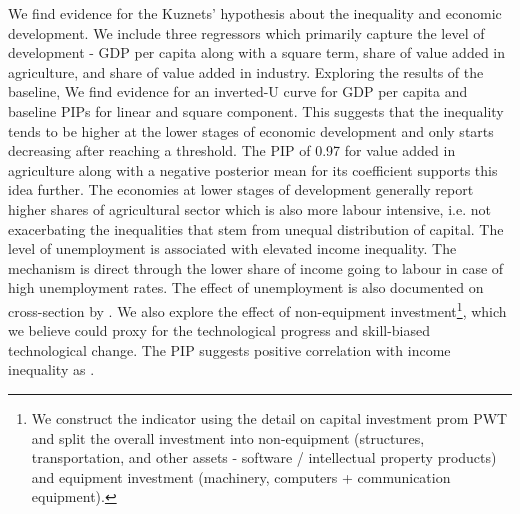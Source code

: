 \begin{refsection}
We find evidence for the Kuznets' hypothesis about the inequality and economic development. We include three regressors which primarily capture the level of development - GDP per capita along with a square term, share of value added in agriculture, and share of value added in industry. Exploring the results of the baseline, We find evidence for an inverted-U curve for GDP per capita and baseline \acp{PIP} for linear and square component. This suggests that the inequality tends to be higher at the lower stages of economic development and only starts decreasing after reaching a threshold. The \ac{PIP} of 0.97 for value added in agriculture along with a negative posterior mean for its coefficient supports this idea further. The economies at lower stages of development generally report higher shares of agricultural sector which is also more labour intensive, i.e. not exacerbating the inequalities that stem from unequal distribution of capital. The level of unemployment is associated with elevated income inequality. The mechanism is direct through the lower share of income going to labour in case of high unemployment rates. The effect of unemployment is also documented on cross-section by \textcite{furceri2019robust}. We also explore the effect of non-equipment investment\footnote{We construct the indicator using the detail on capital investment prom \ac{PWT} and split the overall investment into non-equipment (structures, transportation, and other assets - software / intellectual property products) and equipment investment (machinery, computers + communication equipment).}, which we believe could proxy for the technological progress and skill-biased technological change. The \ac{PIP} suggests positive correlation with income inequality as \textcite{goldin2009race,dabla2015causes}.


\end{refsection}
